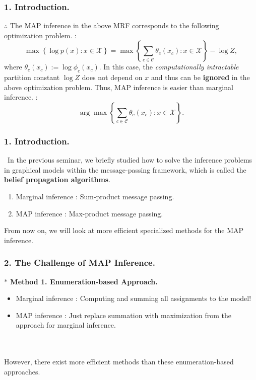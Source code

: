 \documentclass[11pt]{beamer}
\newtheorem*{pf of lemma}{\it Proof of the \normalfont \bf Lemma}
\newtheorem*{pf of claim}{\it Proof of the \normalfont \sf Claim}
\begin{document}
\begin{frame}
\frametitle{1. Introduction.}

$\therefore$ The MAP inference in the above MRF corresponds to the following optimization problem. : 
$$\max \left\{\log p(x) : x \in \mathcal{X} \right\} = \max \left\{ \sum_{c \in \mathcal{C}} \theta_{c}(x_c) : x \in \mathcal{X} \right\} - \log Z,$$ where $\theta_{c}(x_c) := \log \phi_{c}(x_c)$. In this case, the \textit{computationally intractable} partition constant $\log Z$ does not depend on $x$ and thus can be \textbf{ignored} in the above optimization problem. Thus, MAP inference is easier than marginal inference. :
$$\arg \max \left\{ \sum_{c \in \mathcal{C}} \theta_{c} (x_c) : x \in \mathcal{X} \right\}.$$

\end{frame}

\begin{frame}
\frametitle{1. Introduction.}

\ \indent In the previous seminar, we briefly studied how to solve the inference problems in graphical models within the message-passing framework, which is called the \textbf{belief propagation algorithms}. \\
\begin{enumerate}
\item Marginal inference : Sum-product message passing. \\
\item MAP inference : Max-product message passing.
\end{enumerate}
From now on, we will look at more efficient specialized methods for the MAP inference.

\end{frame}

\begin{frame}
\frametitle{2. The Challenge of MAP Inference.}

\textbf{$\ast$ Method 1. Enumeration-based Approach.} \\
\begin{itemize}
\item Marginal inference : Computing and summing all assignments to the model! \\
\item MAP inference : Just replace summation with maximization from the approach for marginal inference.\\
\end{itemize}
\ \\ \ \\
However, there exist more efficient methods than these enumeration-based approaches.
\end{frame}
\end{document}
